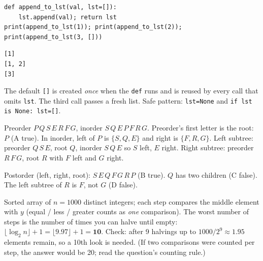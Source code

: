 \documentclass[11pt,a4paper]{article}
\newcommand{\py}[1]{\texttt{#1}}
\begin{document}
\begin{example}
\begin{lstlisting}
def append_to_lst(val, lst=[]):
    lst.append(val); return lst
print(append_to_lst(1)); print(append_to_lst(2)); print(append_to_lst(3, []))
\end{lstlisting}
\begin{lstlisting}[style=out]
[1]
[1, 2]
[3]
\end{lstlisting}
The default \py{[]} is created \emph{once} when the \py{def} runs and is reused by every call that omits \py{lst}. The third call passes a fresh list. Safe pattern: \py{lst=None} and \py{if lst is None: lst=[]}.
\end{example}

\begin{example}
Preorder $P\,Q\,S\,E\,R\,F\,G$, inorder $S\,Q\,E\,P\,F\,R\,G$. Preorder's first letter is the root: $P$ (A true). In inorder, left of $P$ is $\{S,Q,E\}$ and right is $\{F,R,G\}$. Left subtree: preorder $Q\,S\,E$, root $Q$, inorder $S\,Q\,E$ so $S$ left, $E$ right. Right subtree: preorder $R\,F\,G$, root $R$ with $F$ left and $G$ right.
\begin{center}
\end{center}
Postorder (left, right, root): $S\,E\,Q\,F\,G\,R\,P$ (B true). $Q$ has two children (C false). The left subtree of $R$ is $F$, not $G$ (D false).
\end{example}

\begin{example}
Sorted array of $n=1000$ distinct integers; each step compares the middle element with $y$ (equal / less / greater counts as \emph{one} comparison). The worst number of steps is the number of times you can halve until empty: $\lfloor\log_2 n\rfloor+1=\lfloor9.97\rfloor+1=\mathbf{10}$. Check: after 9 halvings up to $1000/2^9\approx1.95$ elements remain, so a 10th look is needed. (If two comparisons were counted per step, the answer would be 20; read the question's counting rule.)
\end{example}
\end{document}
